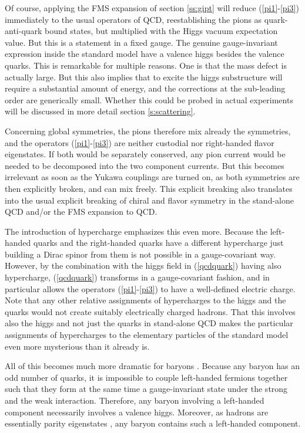 \documentclass[final,12pt,3p,longtitle]{elsarticle}
\newcommand*{\pref}[1]{(\ref{#1})}
\newcommand*{\prefr}[2]{(\ref{#1}-\ref{#2})}
\newcommand*{\1}{1\!\!\!\bot}
\begin{document}
Of course, applying the FMS expansion of section \ref{ss:gipt} will reduce \prefr{pi1}{pi3} immediately to the usual operators of QCD, reestablishing the pions as quark-anti-quark bound states, but multiplied with the Higgs vacuum expectation value. But this is a statement in a fixed gauge. The genuine gauge-invariant expression inside the standard model have a valence higgs besides the valence quarks. This is remarkable for multiple reasons. One is that the mass defect is actually large. But this also implies that to excite the higgs substructure will require a substantial amount of energy, and the corrections at the sub-leading order are generically small. Whether this could be probed in actual experiments will be discussed in more detail section \ref{s:scattering}.

Concerning global symmetries, the pions therefore mix already the symmetries, and the operators \prefr{pi1}{pi3} are neither custodial nor right-handed flavor eigenstates. If both would be separately conserved, any pion current would be needed to be decomposed into the two component currents. But this becomes irrelevant as soon as the Yukawa couplings are turned on, as both symmetries are then explicitly broken, and can mix freely. This explicit breaking also translates into the usual explicit breaking of chiral and flavor symmetry in the stand-alone QCD and/or the FMS expansion to QCD.

The introduction of hypercharge emphasizes this even more. Because the left-handed quarks and the right-handed quarks have a different hypercharge just building a Dirac spinor from them is not possible in a gauge-covariant way. However, by the combination with the higgs field in \pref{qcdquark} having also hypercharge, \pref{qcdquark} transforms in a gauge-covariant fashion, and in particular allows the operators \prefr{pi1}{pi3} to have a well-defined electric charge. Note that any other relative assignments of hypercharges to the higgs and the quarks would not create suitably electrically charged hadrons. That this involves also the higgs and not just the quarks in stand-alone QCD makes the particular assignments of hypercharges to the elementary particles of the standard model even more mysterious than it already is.

All of this becomes much more dramatic for baryons \cite{Egger:2017tkd}. Because any baryon has an odd number of quarks, it is impossible to couple left-handed fermions together such that they form at the same time a gauge-invariant state under the strong and the weak interaction. Therefore, any baryon involving a left-handed component necessarily involves a valence higgs. Moreover, as hadrons are essentially parity eigenstates \cite{pdg,Gattringer:2010zz,DeGrand:2006zz}, any baryon contains such a left-handed component.
\end{document}

